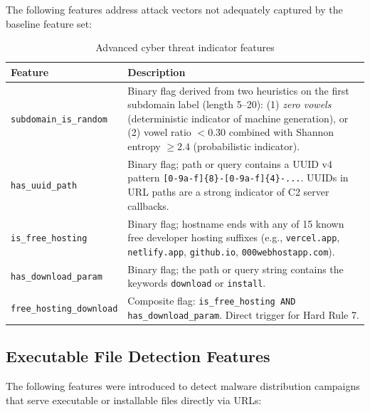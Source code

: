 \documentclass[12pt,a4paper]{article}
\begin{document}
The following features address attack vectors not adequately captured by the baseline feature set:

\begin{table}[H]
    \centering
    \begin{tabularx}{\textwidth}{l >{\raggedright\arraybackslash}X}
        \toprule
        \textbf{Feature} & \textbf{Description} \\
        \midrule
        \texttt{subdomain\_is\_random}   & Binary flag derived from two heuristics on the first subdomain label (length 5--20): (1) \textit{zero vowels} (deterministic indicator of machine generation), or (2) vowel ratio $< 0.30$ combined with Shannon entropy $\geq 2.4$ (probabilistic indicator). \\
        \addlinespace[4pt]
        \texttt{has\_uuid\_path} & Binary flag; path or query contains a UUID v4 pattern \texttt{[0-9a-f]\{8\}-[0-9a-f]\{4\}-...}. UUIDs in URL paths are a strong indicator of C2 server callbacks. \\
        \addlinespace[4pt]
        \texttt{is\_free\_hosting} & Binary flag; hostname ends with any of 15 known free developer hosting suffixes (e.g., \texttt{vercel.app}, \texttt{netlify.app}, \texttt{github.io}, \texttt{000webhostapp.com}). \\
        \addlinespace[4pt]
        \texttt{has\_download\_param} & Binary flag; the path or query string contains the keywords \texttt{download} or \texttt{install}. \\
        \addlinespace[4pt]
        \texttt{free\_hosting\_download} & Composite flag: \texttt{is\_free\_hosting AND has\_download\_param}. Direct trigger for Hard Rule 7. \\
        \bottomrule
    \end{tabularx}
    \caption{Advanced cyber threat indicator features}
    \label{tab:feat_advanced}
\end{table}

\subsection{Executable File Detection Features}

The following features were introduced to detect malware distribution campaigns that serve executable or installable files directly via URLs:
\end{document}
